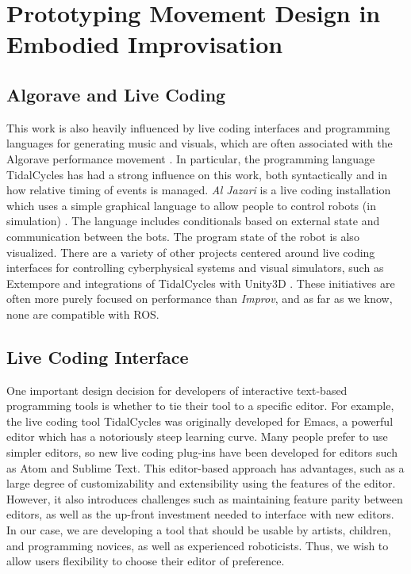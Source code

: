 \documentclass[sigchi-a]{acmart}
\begin{document}

\section{Prototyping Movement Design in Embodied Improvisation}\label{embodied}

\begin{sidebar}

\subsection{Algorave and Live Coding}
This work is also heavily influenced by live coding interfaces and programming
languages for generating music and visuals, which are often associated with the
Algorave performance movement \cite{collins2014algorave}. In particular, the
programming language TidalCycles \cite{mclean2010tidal} has had a strong
influence on this work, both syntactically and in how relative timing of events
is managed. \emph{Al Jazari} is a live coding installation which uses a simple
graphical language to allow people to control robots (in simulation)
\cite{mclean2010visualisation}. The language includes conditionals based on
external state and communication between the bots. The program state of the
robot is also visualized. There are a variety of other projects centered around
live coding interfaces for controlling cyberphysical systems and visual
simulators, such as Extempore and integrations of TidalCycles with Unity3D
\cite{livecoding14}. These initiatives are often more purely focused on
performance than \emph{Improv}, and as far as we know, none are compatible with
ROS.

\subsection{Live Coding Interface}\label{live-coding-interface}

One important design decision for developers of interactive text-based
programming tools is whether to tie their tool to a specific editor. For
example, the live coding tool TidalCycles was originally
developed for Emacs, a powerful editor which has a notoriously steep
learning curve. Many people prefer to use simpler editors, so new
live coding plug-ins have been developed for editors such as Atom and
Sublime Text. This editor-based approach has advantages, such as a large
degree of customizability and extensibility using the features of the
editor. However, it also introduces challenges such as maintaining
feature parity between editors, as well as the up-front investment
needed to interface with new editors. In our case, we are developing a
tool that should be usable by artists, children, and programming
novices, as well as experienced roboticists. Thus, we wish to allow
users flexibility to choose their editor of preference.


\end{sidebar}
\end{document}
